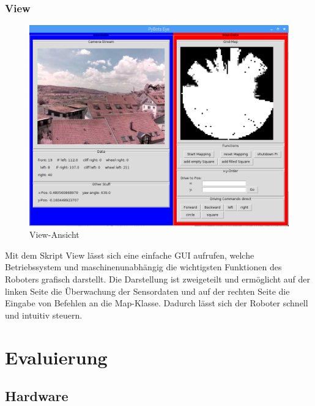 \documentclass[twoside,11pt, a4paper]{report}
\begin{document}
	\subsection{View}
		\begin{figure}[!htb]
		\centering
		\includegraphics[scale=0.45,angle=90]{images/View.png}
		\caption{View-Ansicht}
	\end{figure}
	Mit dem Skript View lässt sich eine einfache GUI aufrufen, welche Betriebssystem und maschinenunabhängig die wichtigsten Funktionen des Roboters grafisch darstellt. Die Darstellung ist zweigeteilt und ermöglicht auf der linken Seite die Überwachung der Sensordaten und auf der rechten Seite die Eingabe von Befehlen an die Map-Klasse. Dadurch lässt sich der Roboter schnell und intuitiv steuern. 
	
	\chapter{Evaluierung}
	\section{Hardware}
\end{document}
